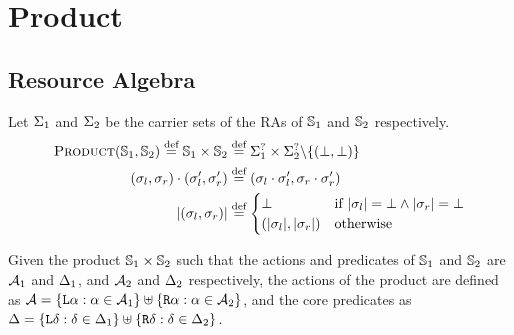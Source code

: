 
\section{Product} \label{rules:product}

\subsection{Resource Algebra}

Let $\Sigma_1$ and $\Sigma_2$ be the carrier sets of the RAs of $\mathbb S_1$ and $\mathbb S_2$ respectively.
\begin{align*}
	\textsc{Product}(\mathbb S_1,\mathbb S_2) \stackrel{\textnormal{def}}= \mathbb S_1 \times \mathbb S_2 &\stackrel{\textnormal{def}}= \Sigma_1^? \times \Sigma_2^? \backslash \{(\bot, \bot)\}\\
	(\sigma_l, \sigma_r) \cdot (\sigma_l', \sigma_r') &\stackrel{\textnormal{def}}= (\sigma_l \cdot \sigma_l', \sigma_r \cdot \sigma_r')\\
	|(\sigma_l, \sigma_r)| &\stackrel{\textnormal{def}}= \begin{cases}
		\bot &\text{if}~|\sigma_l|=\bot\land |\sigma_r|=\bot\\
		(|\sigma_l|, |\sigma_r|) &\text{otherwise}
 	\end{cases}
\end{align*}

Given the product $\mathbb S_1 \times \mathbb S_2$ such that the actions and predicates of $\mathbb S_1$ and $\mathbb S_2$ are ${\cal{A}}_1$ and $\Delta_1$, and ${\cal{A}}_2$ and $\Delta_2$ respectively, the actions of the product are defined as ${{\cal{A}} = \{\texttt{L}\alpha : \alpha \in {\ensuremath{\cal{A}}}_1 \} \uplus \{\texttt{R}\alpha : \alpha \in {\ensuremath{\cal{A}}}_2 \}}$, and the core predicates as ${\Delta = \{\texttt{L}\delta : \delta \in \Delta_1 \} \uplus \{\texttt{R}\delta : \delta \in \Delta_2 \}}$.

